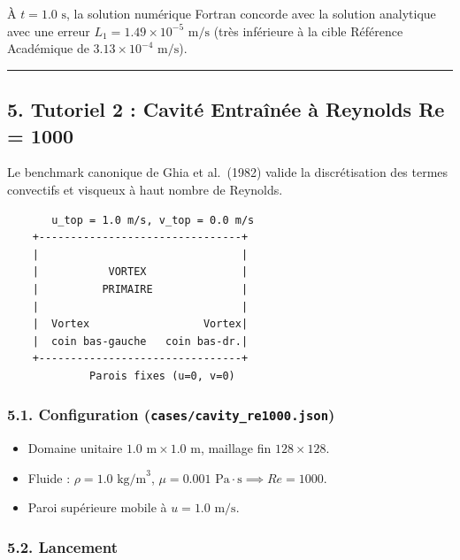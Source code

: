 \documentclass[
  french,
]{article}
\providecommand{\tightlist}{%
  \setlength{\itemsep}{0pt}\setlength{\parskip}{0pt}}
\begin{document}
À \(t = 1.0\text{ s}\), la solution numérique Fortran concorde avec la
solution analytique avec une erreur
\(L_1 = 1.49 \times 10^{-5}\text{ m/s}\) (très inférieure à la cible
Référence Académique de \(3.13 \times 10^{-4}\text{ m/s}\)).

\begin{center}\rule{0.5\linewidth}{0.5pt}\end{center}

\subsection{5. Tutoriel 2 : Cavité Entraînée à Reynolds Re =
1000}\label{tutoriel-2-cavituxe9-entrauxeenuxe9e-uxe0-reynolds-re-1000}

Le benchmark canonique de Ghia et al.~(1982) valide la discrétisation
des termes convectifs et visqueux à haut nombre de Reynolds.

\begin{verbatim}
       u_top = 1.0 m/s, v_top = 0.0 m/s
    +--------------------------------+
    |                                |
    |           VORTEX               |
    |          PRIMAIRE              |
    |                                |
    |  Vortex                  Vortex|
    |  coin bas-gauche   coin bas-dr.|
    +--------------------------------+
             Parois fixes (u=0, v=0)
\end{verbatim}

\subsubsection{\texorpdfstring{5.1. Configuration
(\texttt{cases/cavity\_re1000.json})}{5.1. Configuration (cases/cavity\_re1000.json)}}\label{configuration-casescavity_re1000.json}

\begin{itemize}
\tightlist
\item
  Domaine unitaire \(1.0\text{ m} \times 1.0\text{ m}\), maillage fin
  \(128 \times 128\).
\item
  Fluide : \(\rho = 1.0\text{ kg/m}^3\),
  \(\mu = 0.001\text{ Pa}\cdot\text{s} \implies Re = 1000\).
\item
  Paroi supérieure mobile à \(u = 1.0\text{ m/s}\).
\end{itemize}

\subsubsection{5.2. Lancement}\label{lancement}
\end{document}

